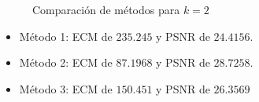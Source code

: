 \begin{figure}[H]
    \centering
    \qquad
    \qquad
    \caption{Comparación de métodos para $k = 2$}%
    \label{fig:example}%
\end{figure}

\begin{itemize}
 \item Método 1: ECM de $235.245$ y PSNR de $24.4156$.
 \item Método 2: ECM de $87.1968$ y PSNR de $28.7258$.
 \item Método 3: ECM de $150.451$ y PSNR de $26.3569$
\end{itemize}

